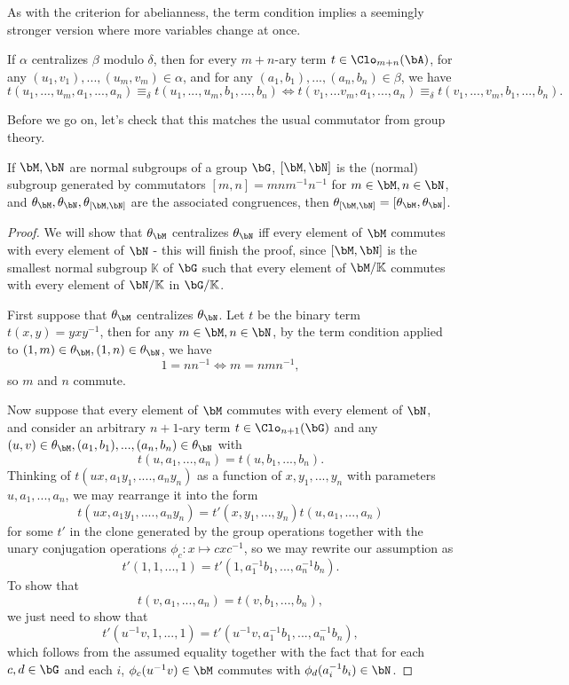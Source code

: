 As with the criterion for abelianness, the term condition implies a seemingly stronger version where more variables change at once.

\begin{prop} If $\alpha$ centralizes $\beta$ modulo $\delta$, then for every $m+n$-ary term $t \in \Clo_{m+n}(\bA)$, for any $(u_1,v_1), ..., (u_m,v_m) \in \alpha$, and for any $(a_1,b_1), ..., (a_n,b_n) \in \beta$, we have
\[
t(u_1,...,u_m,a_1, ..., a_n) \equiv_\delta t(u_1,...,u_m,b_1, ..., b_n) \iff t(v_1,...v_m,a_1,...,a_n) \equiv_\delta t(v_1,...,v_m,b_1,...,b_n).
\]
\end{prop}

Before we go on, let's check that this matches the usual commutator from group theory.

\begin{prop} If $\bM,\bN$ are normal subgroups of a group $\bG$, $[\bM,\bN]$ is the (normal) subgroup generated by commutators $[m,n] = mnm^{-1}n^{-1}$ for $m \in \bM, n \in \bN$, and $\theta_\bM, \theta_\bN, \theta_{[\bM,\bN]}$ are the associated congruences, then $\theta_{[\bM,\bN]} = [\theta_\bM,\theta_\bN]$.
\end{prop}
\begin{proof} We will show that $\theta_\bM$ centralizes $\theta_\bN$ iff every element of $\bM$ commutes with every element of $\bN$ - this will finish the proof, since $[\bM,\bN]$ is the smallest normal subgroup $\mathbb{K}$ of $\bG$ such that every element of $\bM/\mathbb{K}$ commutes with every element of $\bN/\mathbb{K}$ in $\bG/\mathbb{K}$.

First suppose that $\theta_\bM$ centralizes $\theta_\bN$. Let $t$ be the binary term $t(x,y) = yxy^{-1}$, then for any $m\in\bM, n\in\bN$, by the term condition applied to $(1,m) \in \theta_\bM, (1,n) \in \theta_\bN$, we have
\[
1 = nn^{-1} \iff m = nmn^{-1},
\]
so $m$ and $n$ commute.

Now suppose that every element of $\bM$ commutes with every element of $\bN$, and consider an arbitrary $n+1$-ary term $t \in \Clo_{n+1}(\bG)$ and any $(u,v) \in \theta_\bM, (a_1,b_1), ..., (a_n,b_n) \in \theta_\bN$ with
\[
t(u,a_1,...,a_n) = t(u,b_1,...,b_n).
\]
Thinking of $t(ux,a_1y_1,....,a_ny_n)$ as a function of $x,y_1,...,y_n$ with parameters $u,a_1,...,a_n$, we may rearrange it into the form
\[
t(ux,a_1y_1,....,a_ny_n) = t'(x,y_1,...,y_n)t(u,a_1,...,a_n)
\]
for some $t'$ in the clone generated by the group operations together with the unary conjugation operations $\phi_c: x \mapsto cxc^{-1}$, so we may rewrite our assumption as
\[
t'(1,1,...,1) = t'(1,a_1^{-1}b_1,...,a_n^{-1}b_n).
\]
To show that
\[
t(v,a_1,...,a_n) = t(v,b_1,...,b_n),
\]
we just need to show that
\[
t'(u^{-1}v,1,...,1) = t'(u^{-1}v,a_1^{-1}b_1,...,a_n^{-1}b_n),
\]
which follows from the assumed equality together with the fact that for each $c,d \in \bG$ and each $i$, $\phi_c(u^{-1}v) \in \bM$ commutes with $\phi_d(a_i^{-1}b_i) \in \bN$.
\end{proof}


